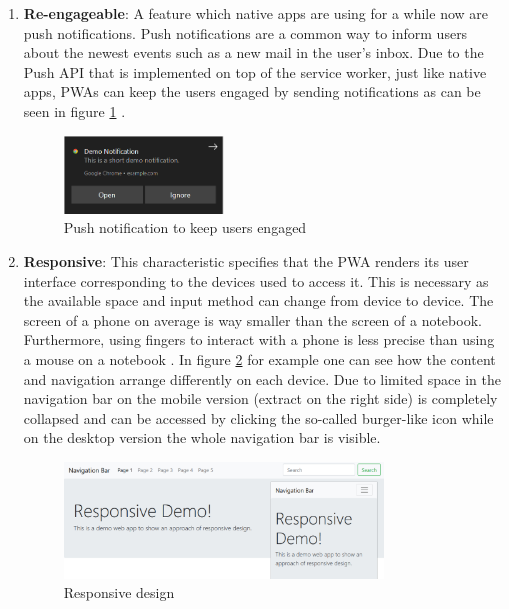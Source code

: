 \begin{enumerate}
	\item \textbf{Re-engageable}: A feature which native apps are using for a while now are push notifications. Push notifications are a common way to inform users about the newest events such as a new mail in the user’s inbox. Due to the Push API that is implemented on top of the service worker, just like native apps,  \acs{PWA}s can keep the users engaged by sending notifications as can be seen in figure \ref{fig:pwa_reengageable} \cite[p. 201]{hajianProgressiveWebApps2019}.

\begin{figure}[htbp] 
	\centering
	\includegraphics[width=0.4\textwidth]{Assets/chapter_pwa/demonotification.PNG}
	\caption{Push notification to keep users engaged}
	\label{fig:pwa_reengageable}
\end{figure}

	\item \textbf{Responsive}: This characteristic specifies that the  \acs{PWA} renders its user interface corresponding to the devices used to access it. This is necessary as the available space and input method can change from device to device. The screen of a phone on average is way smaller than the screen of a notebook. Furthermore, using fingers to interact with a phone is less precise than using a mouse on a notebook \cite[pp. 115-116]{liebelProgressiveWebApps2019}. In figure \ref{fig:pwa_responsive} for example one can see how the content and navigation arrange differently on each device. Due to limited space in the navigation bar on the mobile version (extract on the right side) is completely collapsed and can be accessed by clicking the so-called burger-like icon while on the desktop version the whole navigation bar is visible.

\begin{figure}[htbp] 
	\centering
	\includegraphics[width=0.8\textwidth]{Assets/chapter_pwa/responsive-overall.jpg}
	\caption{Responsive design}
	\label{fig:pwa_responsive}
\end{figure}


\end{enumerate}
